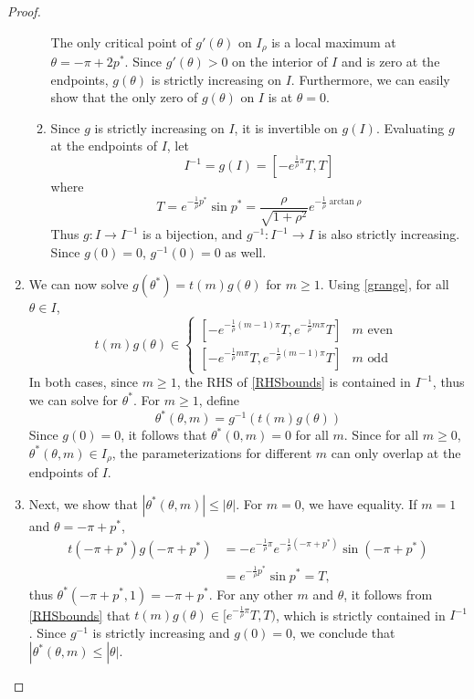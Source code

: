 \documentclass[thesis.tex]{subfiles}
\begin{document}
\begin{lemma}
\begin{proof}
\begin{enumerate}
\begin{enumerate}
	The only critical point of $g'(\theta)$ on $I_\rho$ is a local maximum at $\theta = - \pi + 2 p^*$. Since $g'(\theta) > 0$ on the interior of $I$ and is zero at the endpoints, $g(\theta)$ is strictly increasing on $I$. Furthermore, we can easily show that the only zero of $g(\theta)$ on $I$ is at $\theta = 0$.
	
	\item Since $g$ is strictly increasing on $I$, it is invertible on $g(I)$. Evaluating $g$ at the endpoints of $I$, let
	\begin{equation}\label{grange}
	I^{-1} = g(I) = [-e^{\frac{1}{\rho}\pi} T, T]
	\end{equation}
	where 
	\begin{equation}\label{defT}
	T = e^{-\frac{1}{\rho}p^*} \sin p^* = \frac{\rho}{\sqrt{1+\rho^2}}e^{-\frac{1}{\rho}\arctan \rho}
	\end{equation}
	Thus $g: I \rightarrow I^{-1}$ is a bijection, and $g^{-1}: I^{-1} \rightarrow I$ is also strictly increasing. Since $g(0) = 0$, $g^{-1}(0) = 0$ as well.
\end{enumerate}

\item We can now solve $g(\theta^*) = t(m) g(\theta)$ for $m \geq 1$. Using \cref{grange}, for all $\theta \in I$,
	\begin{equation}\label{RHSbounds}
	t(m)g(\theta) \in
	\begin{cases}
	[-e^{-\frac{1}{\rho}(m-1) \pi} T, e^{-\frac{1}{\rho}m \pi} T] & m \text{ even }\\
	[-e^{-\frac{1}{\rho}m \pi} T, e^{-\frac{1}{\rho}(m-1) \pi} T] & m \text{ odd }
	\end{cases}
	\end{equation}
	In both cases, since $m \geq 1$, the RHS of \cref{RHSbounds} is contained in $I^{-1}$, thus we can solve for $\theta^*$. For $m \geq 1$, define
	\begin{equation}\label{solvethetastar}
	\theta^*(\theta, m) = g^{-1}\left( t(m) g(\theta) \right)
	\end{equation}
	Since $g(0) = 0$, it follows that $\theta^*(0, m) = 0$ for all $m$.	Since for all $m \geq 0$, $\theta^*(\theta, m) \in I_\rho$, the parameterizations for different $m$ can only overlap at the endpoints of $I$.

\item Next, we show that $|\theta^*(\theta, m)| \leq |\theta|$. For $m = 0$, we have equality. If $m = 1$ and $\theta = -\pi + p^*$,
\begin{align*}
t(-\pi + p^*)g(-\pi + p^*) &= -e^{-\frac{1}{\rho}\pi}e^{-\frac{1}{\rho}(-\pi+p^*)}\sin(-\pi + p^*) \\
&= e^{-\frac{1}{\rho}p^*} \sin p^* = T,
\end{align*}
thus $\theta^*(-\pi + p^*, 1) = -\pi + p^*$. For any other $m$ and $\theta$, it follows from \cref{RHSbounds} that $t(m)g(\theta) \in [e^{-\frac{1}{\rho}\pi}T, T)$, which is strictly contained in $I^{-1}$. Since $g^{-1}$ is strictly increasing and $g(0) = 0$, we conclude that $|\theta^*(\theta, m) \leq |\theta|$.


\end{enumerate}
\end{proof}
\end{lemma}
\end{document}
